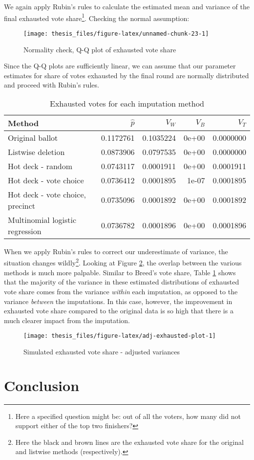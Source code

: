 \documentclass[12pt,twoside]{reedthesis}
\begin{document}
We again apply Rubin's rules to calculate the estimated mean and variance of the final exhausted vote share\footnote{Here a specified question might be: out of all the voters, how many did not support either of the top two finishers?}. Checking the normal assumption:
\begin{figure}
\texttt{[image: thesis\_files/figure-latex/unnamed-chunk-23-1]} \caption{Normality check, Q-Q plot of exhausted vote share}\label{fig:unnamed-chunk-23}
\end{figure}
Since the Q-Q plots are sufficiently linear, we can assume that our parameter estimates for share of votes exhausted by the final round are normally distributed and proceed with Rubin's rules.
\begin{longtable}{lrrrr}
\caption[Simulated exhausted votes]{\label{tab:adj-exhausted-tab}Exhausted votes for each imputation method}\\
\toprule
Method & $\hat{p}$ & $V_W$ & $V_B$ & $V_T$\\
\midrule
Original ballot & 0.1172761 & 0.1035224 & 0e+00 & 0.0000000\\
Listwise deletion & 0.0873906 & 0.0797535 & 0e+00 & 0.0000000\\
Hot deck - random & 0.0743117 & 0.0001911 & 0e+00 & 0.0001911\\
Hot deck - vote choice & 0.0736412 & 0.0001895 & 1e-07 & 0.0001895\\
Hot deck - vote choice, precinct & 0.0735096 & 0.0001892 & 0e+00 & 0.0001892\\
\addlinespace
Multinomial logistic regression & 0.0736782 & 0.0001896 & 0e+00 & 0.0001896\\
\bottomrule
\end{longtable}
When we apply Rubin's rules to correct our underestimate of variance, the situation changes wildly\footnote{Here the black and brown lines are the exhausted vote share for the original and listwise methods (respectively).}. Looking at Figure \ref{fig:adj-exhausted-plot}, the overlap between the various methods is much more palpable. Similar to Breed's vote share, Table \ref{tab:adj-exhausted-tab} shows that the majority of the variance in these estimated distributions of exhausted vote share comes from the variance \emph{within} each imputation, as opposed to the variance \emph{between} the imputations. In this case, however, the improvement in exhausted vote share compared to the original data is so high that there is a much clearer impact from the imputation.
\begin{figure}
\texttt{[image: thesis\_files/figure-latex/adj-exhausted-plot-1]} \caption{Simulated exhausted vote share - adjusted variances}\label{fig:adj-exhausted-plot}
\end{figure}
\hypertarget{conclusion}{%
\chapter*{Conclusion}\label{conclusion}}
\end{document}
